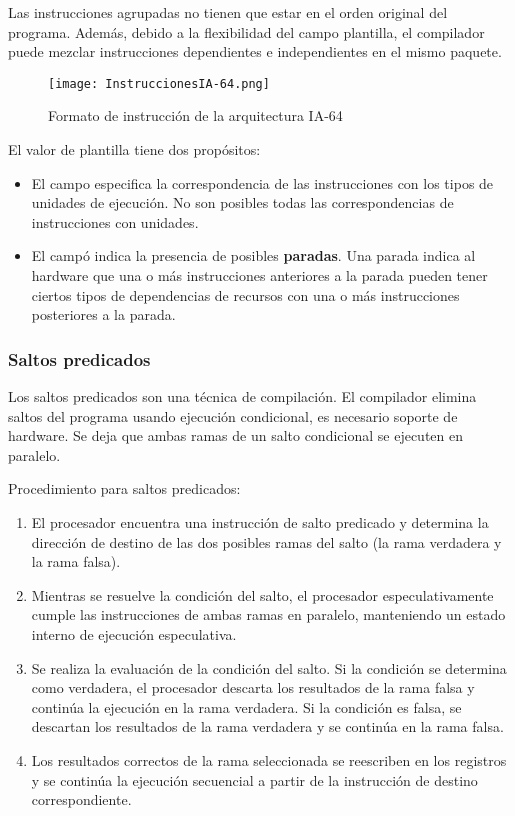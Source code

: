 Las instrucciones agrupadas no tienen que estar en el orden original del programa. Además, debido a la flexibilidad del campo plantilla, el compilador puede mezclar instrucciones dependientes e independientes en el mismo paquete.

\begin{figure}[h]
  \centering
  \texttt{[image: InstruccionesIA-64.png]}
  \caption{Formato de instrucción de la arquitectura IA-64}
\end{figure}

El valor de plantilla tiene dos propósitos:

\begin{itemize}
  \item El campo especifica la correspondencia de las instrucciones con los tipos de unidades de ejecución. No son posibles todas las correspondencias de instrucciones con unidades.
  \item El campó indica la presencia de posibles \textbf{paradas}. Una parada indica al hardware que una o más instrucciones anteriores a la parada pueden tener ciertos tipos de dependencias de recursos con una o más instrucciones posteriores a la parada.
\end{itemize}

\subsubsection*{Saltos predicados}

Los saltos predicados son una técnica de compilación. El compilador elimina saltos del programa usando ejecución condicional, es necesario soporte de hardware. Se deja que ambas ramas de un salto condicional se ejecuten en paralelo.

Procedimiento para saltos predicados:

\begin{enumerate}
  \item El procesador encuentra una instrucción de salto predicado y determina la dirección de destino de las dos posibles ramas del salto (la rama verdadera y la rama falsa).
  \item Mientras se resuelve la condición del salto, el procesador especulativamente cumple las instrucciones de ambas ramas en paralelo, manteniendo un estado interno de ejecución especulativa.
  \item Se realiza la evaluación de la condición del salto. Si la condición se determina como verdadera, el procesador descarta los resultados de la rama falsa y continúa la ejecución en la rama verdadera. Si la condición es falsa, se descartan los resultados de la rama verdadera y se continúa en la rama falsa.
  \item Los resultados correctos de la rama seleccionada se reescriben en los registros y se continúa la ejecución secuencial a partir de la instrucción de destino correspondiente.
\end{enumerate}